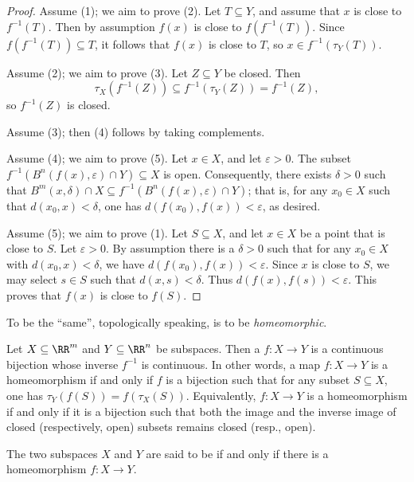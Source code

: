 \begin{proof}
	Assume (1); we aim to prove (2).
	Let $T \subseteq Y $, and assume that $ x $ is close to $f^{-1}(T)$.
	Then by assumption $f(x) $ is close to $f(f^{-1}(T))$.
	Since $f(f^{-1}(T)) \subseteq T$, it follows that $f(x)$ is close to $T$, so $x \in f^{-1}(\tau_Y(T))$.

	Assume (2); we aim to prove (3).
	Let $ Z \subseteq Y $ be closed.
	Then
	\[
		\tau_X(f^{-1}(Z)) \subseteq f^{-1}(\tau_Y(Z)) = f^{-1}(Z) \comma
	\]
	so $f^{-1}(Z) $ is closed.

	Assume (3); then (4) follows by taking complements.

	Assume (4); we aim to prove (5).
	Let $ x \in X$, and let $\varepsilon > 0$.
	The subset $f^{-1}(B^n(f(x),\varepsilon)\cap Y) \subseteq X$ is open.
	Consequently, there exists $\delta>0$ such that $B^m(x,\delta)\cap X \subseteq f^{-1}(B^n(f(x),\varepsilon)\cap Y)$;
	that is, for any $x_0 \in X$ such that $d(x_0,x)<\delta$, one has $d(f(x_0),f(x))<\varepsilon$, as desired.

	Assume (5); we aim to prove (1).
	Let $S \subseteq X $, and let $ x\in X$ be a point that is close to $S$.
	Let $\varepsilon > 0$.
	By assumption there is a $\delta>0$ such that for any $x_0 \in X $ with $d(x_0,x)<\delta$, we have $d(f(x_0),f(x))<\varepsilon$.
	Since $x $ is close to $S$, we may select $s \in S $ such that $d(x,s) <\delta$.
	Thus $d(f(x),f(s))<\varepsilon$.
	This proves that $f(x)$ is close to $f(S)$.
\end{proof}

To be the \enquote{same}, topologically speaking, is to be \emph{homeomorphic}.
\begin{dfn}
	Let $ X \subseteq \RR^m$ and $Y \subseteq \RR^n $ be subspaces.
	Then a  $ f \colon X \to Y $ is a continuous bijection whose inverse $f^{-1}$ is continuous.
	In other words, a map $f \colon X \to Y $ is a homeomorphism if and only if $f $ is a bijection such that for any subset $S \subseteq X $, one has $\tau_Y(f(S)) = f(\tau_X(S))$.
	Equivalently, $f \colon X \to Y $ is a homeomorphism if and only if it is a bijection such that both the image and the inverse image of closed (respectively, open) subsets remains closed (resp., open).

	The two subspaces $X$ and $Y$ are said to be  if and only if there is a homeomorphism $f \colon X \to Y $.
\end{dfn}

